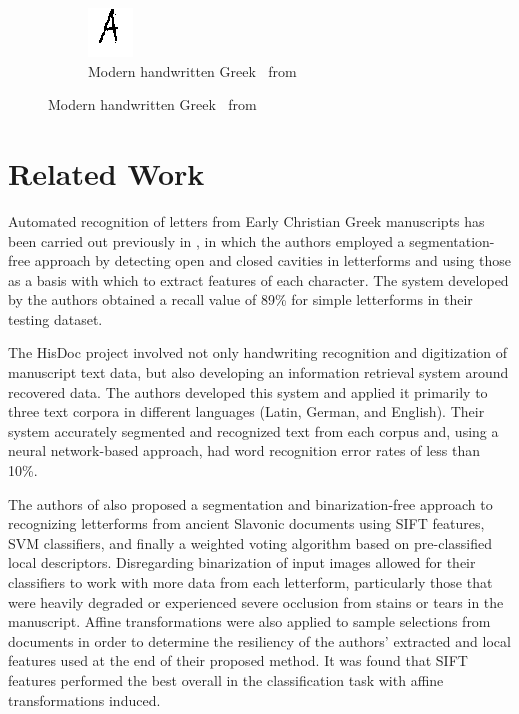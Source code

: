 \documentclass[10pt,twocolumn,letterpaper]{article}
\begin{document}
\begin{figure}
    \begin{subfigure}{0.5\textwidth}
        \centering
        \includegraphics[width=0.4\linewidth]{res/form14.png}
        \caption{Modern handwritten Greek \textAlpha$\:$ from \cite{GCDB}}
        \label{fig:malpha}
    \end{subfigure}
\end{figure}



\section{Related Work}

Automated recognition of letters from Early Christian Greek manuscripts has been carried out previously in \cite{segFree}, in which the authors employed a segmentation-free approach by detecting open and closed cavities in letterforms and using those as a basis with which to extract features of each character. The system developed by the authors obtained a recall value of 89\% for simple letterforms in their testing dataset.

The HisDoc project \cite{HisDoc} involved not only handwriting recognition and digitization of manuscript text data, but also developing an information retrieval system around recovered data. The authors developed this system and applied it primarily to three text corpora in different languages (Latin, German, and English). Their system accurately segmented and recognized text from each corpus and, using a neural network-based approach, had word recognition error rates of less than 10\%.

The authors of \cite{Diem1} also proposed a segmentation and binarization-free approach to recognizing letterforms from ancient Slavonic documents using SIFT features, SVM classifiers, and finally a weighted voting algorithm based on pre-classified local descriptors. Disregarding binarization of input images allowed for their classifiers to work with more data from each letterform, particularly those that were heavily degraded or experienced severe occlusion from stains or tears in the manuscript. Affine transformations were also applied to sample selections from documents in order to determine the resiliency of the authors' extracted and local features used at the end of their proposed method. It was found that SIFT features performed the best overall in the classification task with affine transformations induced.
\end{document}

